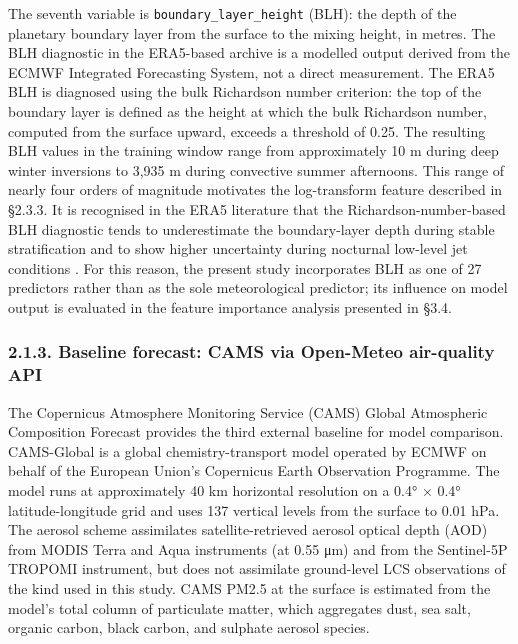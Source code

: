The seventh variable is \texttt{boundary\_layer\_height} (BLH): the depth of the planetary boundary layer from the surface to the mixing height, in metres. The BLH diagnostic in the ERA5-based archive is a modelled output derived from the ECMWF Integrated Forecasting System, not a direct measurement. The ERA5 BLH is diagnosed using the bulk Richardson number criterion: the top of the boundary layer is defined as the height at which the bulk Richardson number, computed from the surface upward, exceeds a threshold of 0.25. The resulting BLH values in the training window range from approximately 10 m during deep winter inversions to 3,935 m during convective summer afternoons. This range of nearly four orders of magnitude motivates the log-transform feature described in §2.3.3. It is recognised in the ERA5 literature that the Richardson-number-based BLH diagnostic tends to underestimate the boundary-layer depth during stable stratification and to show higher uncertainty during nocturnal low-level jet conditions \cite{guo2021blh}. For this reason, the present study incorporates BLH as one of 27 predictors rather than as the sole meteorological predictor; its influence on model output is evaluated in the feature importance analysis presented in §3.4.

\subsubsection{2.1.3. Baseline forecast: CAMS via Open-Meteo air-quality API}\label{baseline-forecast-cams-via-open-meteo-air-quality-api}

The Copernicus Atmosphere Monitoring Service (CAMS) Global Atmospheric Composition Forecast provides the third external baseline for model comparison. CAMS-Global is a global chemistry-transport model operated by ECMWF on behalf of the European Union's Copernicus Earth Observation Programme. The model runs at approximately 40 km horizontal resolution on a 0.4° × 0.4° latitude-longitude grid and uses 137 vertical levels from the surface to 0.01 hPa. The aerosol scheme assimilates satellite-retrieved aerosol optical depth (AOD) from MODIS Terra and Aqua instruments (at 0.55 μm) and from the Sentinel-5P TROPOMI instrument, but does not assimilate ground-level LCS observations of the kind used in this study. CAMS PM2.5 at the surface is estimated from the model's total column of particulate matter, which aggregates dust, sea salt, organic carbon, black carbon, and sulphate aerosol species.

